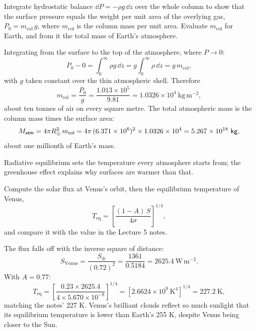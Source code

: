 \parti Integrate hydrostatic balance $\dd P = -\rho g\,\dd z$ over the whole column to show that
the surface pressure equals the weight per unit area of the overlying gas, $P_0 = m_{\mathrm{col}}\,g$,
where $m_{\mathrm{col}}$ is the column mass per unit area.
Evaluate $m_{\mathrm{col}}$ for Earth,
and from it the total mass of Earth's atmosphere.

\begin{solution}
Integrating from the surface to the top of the atmosphere, where $P \to 0$:
\[
P_0 - 0 = \int_0^{\infty} \rho g\,\dd z = g \int_0^{\infty} \rho\,\dd z = g\,m_{\mathrm{col}},
\]
with $g$ taken constant over the thin atmospheric shell. Therefore
\[
m_{\mathrm{col}} = \frac{P_0}{g} = \frac{1.013 \times 10^{5}}{9.81} = 1.0326 \times 10^{4}\ \mathrm{kg\,m^{-2}},
\]
about ten tonnes of air on every square metre.
The total atmospheric mass is the column mass times the surface area:
\[
M_{\mathsf{atm}} = 4\pi R_{\oplus}^2\,m_{\mathsf{col}} = 4\pi\,(6.371 \times 10^{6})^2 \times 1.0326 \times 10^{4} = 5.267 \times 10^{18}\ \mathsf{kg},
\]
about one millionth of Earth's mass.
\end{solution}


Radiative equilibrium sets the temperature every atmosphere starts from;
the greenhouse effect explains why surfaces are warmer than that.

\parti Compute the solar flux at Venus's orbit,
then the equilibrium temperature of Venus,
\[
T_{\mathrm{eq}} = \left[\frac{(1 - A)\,S}{4\sigma}\right]^{1/4},
\]
and compare it with the value in the Lecture 5 notes.

\begin{solution}
The flux falls off with the inverse square of distance:
\[
S_{\mathrm{Venus}} = \frac{S_\oplus}{(0.72)^2} = \frac{1361}{0.5184} = 2625.4\ \mathrm{W\,m^{-2}}.
\]
With $A = 0.77$:
\[
T_{\mathrm{eq}} = \left[\frac{0.23 \times 2625.4}{4 \times 5.670 \times 10^{-8}}\right]^{1/4}
= \left[2.6624 \times 10^{9}\ \mathrm{K}^4\right]^{1/4} = 227.2\ \mathrm{K},
\]
matching the notes' 227 K. Venus's brilliant clouds reflect so much sunlight that its equilibrium
temperature is lower than Earth's 255 K, despite Venus being closer to the Sun.
\end{solution}

